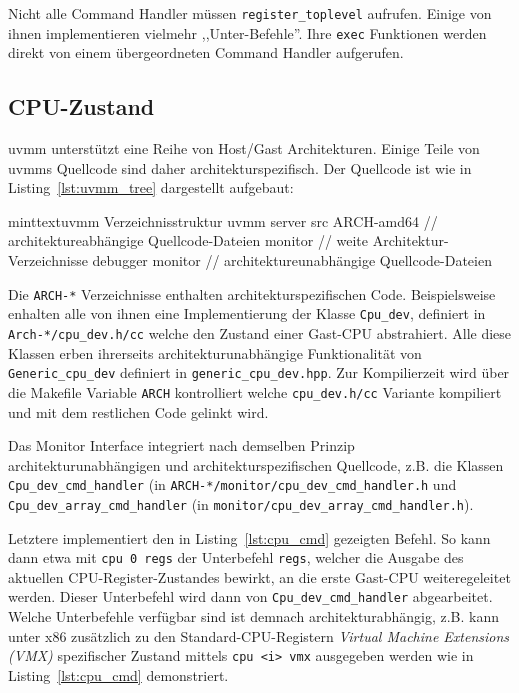 Nicht alle Command Handler müssen \texttt{register\_toplevel} aufrufen. Einige
von ihnen implementieren vielmehr ,,Unter-Befehle''. Ihre \texttt{exec}
Funktionen werden direkt von einem übergeordneten Command Handler aufgerufen.

\subsection{CPU-Zustand}

uvmm unterstützt eine Reihe von Host/Gast Architekturen. Einige Teile von uvmms
Quellcode sind daher architekturspezifisch. Der Quellcode ist
wie in Listing~\ref{lst:uvmm_tree} dargestellt aufgebaut:

\begin{mintlisting}[label=lst:uvmm_tree]{minttext}{uvmm Verzeichnisstruktur}
uvmm
  server
    src
      ARCH-amd64
        // architektureabhängige Quellcode-Dateien
        monitor
      // weite Architektur-Verzeichnisse
      debugger
      monitor
      // architektureunabhängige Quellcode-Dateien
\end{mintlisting}

Die \texttt{ARCH-*} Verzeichnisse enthalten architekturspezifischen Code.
Beispielsweise enhalten alle von ihnen eine Implementierung der Klasse
\texttt{Cpu\_dev}, definiert in \texttt{Arch-*/cpu\_dev.h/cc} welche den
Zustand einer Gast-CPU abstrahiert. Alle diese Klassen erben ihrerseits
architekturunabhängige Funktionalität von \texttt{Generic\_cpu\_dev} definiert
in \texttt{generic\_cpu\_dev.hpp}. Zur Kompilierzeit wird über die Makefile
Variable \texttt{ARCH} kontrolliert welche \texttt{cpu\_dev.h/cc} Variante
kompiliert und mit dem restlichen Code gelinkt wird.

Das Monitor Interface integriert nach demselben Prinzip architekturunabhängigen
und architekturspezifischen Quellcode, z.B. die Klassen \texttt{Cpu\_dev\_cmd\_handler} (in \texttt{ARCH-*/monitor/cpu\_dev\_cmd\_handler.h} und \texttt{Cpu\_dev\_array\_cmd\_handler} (in
\texttt{monitor/cpu\_dev\_array\_cmd\_handler.h}).

Letztere implementiert den in Listing~\ref{lst:cpu_cmd} gezeigten Befehl.
So kann dann etwa mit \texttt{cpu 0 regs} der Unterbefehl \texttt{regs},
welcher die Ausgabe des aktuellen CPU-Register-Zustandes bewirkt, an die
erste Gast-CPU weiteregeleitet werden. Dieser Unterbefehl wird dann von
\texttt{Cpu\_dev\_cmd\_handler} abgearbeitet. Welche Unterbefehle verfügbar
sind ist demnach architekturabhängig, z.B. kann unter x86 zusätzlich zu den
Standard-CPU-Registern \textit{Virtual Machine Extensions (VMX)} spezifischer
Zustand mittels \texttt{cpu <i> vmx} ausgegeben werden wie in Listing~\ref{lst:cpu_cmd} demonstriert.

